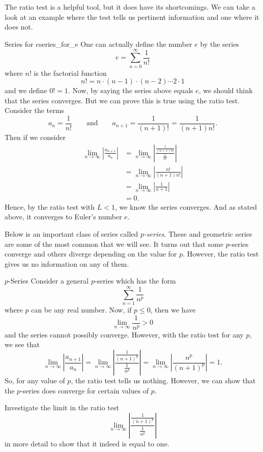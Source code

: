 The ratio test is a helpful tool, but it does have its shortcomings.  We can take a look at an example where the test tells us pertinent information and one where it does not.  

\begin{ex}{Series for $e$}{series_for_e}
One can actually define the number $e$ by the series
\[
e=\sum_{n=0}^\infty \frac{1}{n!}
\]
where $n!$ is the factorial function 
\[
n!=n\cdot (n-1)\cdot (n-2)\cdots 2\cdot 1
\]
and we define $0!=1$.  Now, by saying the series above equals $e$, we should think that the series converges. But we can prove this is true using the ratio test.  Consider the terms
\[
a_n = \frac{1}{n!} \qquad \textrm{and} \qquad a_{n+1}=\frac{1}{(n+1)!}=\frac{1}{(n+1)n!}.
\]
Then if we consider
\begin{align*}
    \lim_{n\to \infty} \left| \frac{a_{n+1}}{a_n}\right|&= \lim_{n\to \infty} \left| \frac{\frac{1}{(n+1)n!}}{\frac{1}{n!}}\right|\\
    &= \lim_{n\to \infty } \left| \frac{n!}{(n+1)n!}\right|\\
    &= \lim_{n \to \infty} \left| \frac{1}{n+1}\right|\\
    &= 0.
\end{align*}
Hence, by the ratio test with $L<1$, we know the series converges. And as stated above, it converges to Euler's number $e$.
\end{ex}

Below is an important class of series called \emph{$p$-series}. These and geometric series are some of the most common that we will see.  It turns out that some $p$-series converge and others diverge depending on the value for $p$. However, the ratio test gives us no information on any of them.

\begin{ex}{$p$-Series}{}
Consider a general $p$-series which has the form
\[
\sum_{n=1}^\infty \frac{1}{n^p}
\]
where $p$ can be any real number. Now, if $p\leq 0$, then we have
\[
\lim_{n \to \infty} \frac{1}{n^p}>0
\]
and the series cannot possibly converge.  However, with the ratio test for any $p$, we see that
\[
\lim_{n\to \infty} \left|\frac{a_{n+1}}{a_n}\right|=\lim_{n\to \infty} \left|\frac{\frac{1}{(n+1)^p}}{\frac{1}{n^p}}\right|  = \lim_{n\to \infty} \left| \frac{n^p}{(n+1)^p}\right| = 1.
\]
So, for any value of $p$, the ratio test tells us nothing.  However, we can show that the $p$-series does converge for certain values of $p$.
\end{ex}

\begin{exercise}
Investigate the limit in the ratio test 
\[
\lim_{n\to \infty} \left|\frac{\frac{1}{(n+1)^p}}{\frac{1}{n^p}}\right|
\]
in more detail to show that it indeed is equal to one.
\end{exercise}

